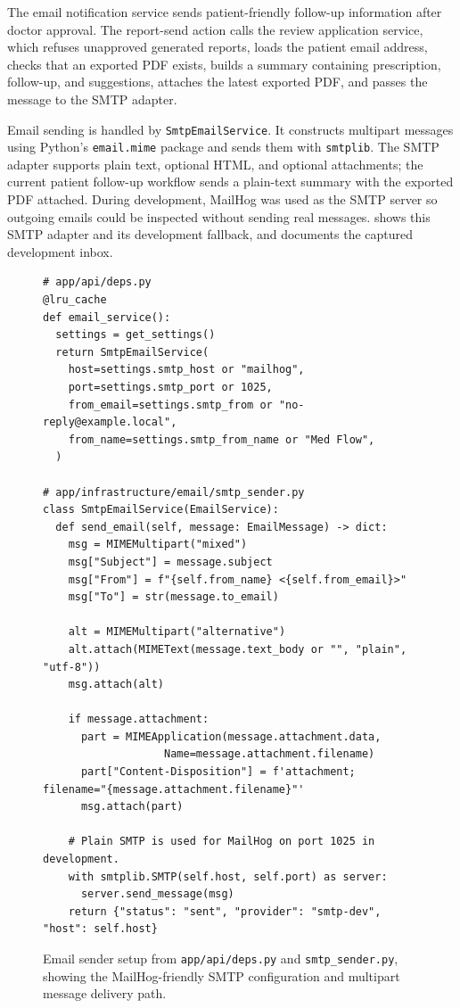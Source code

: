 The email notification service sends patient-friendly follow-up information after doctor approval. The report-send action calls the review application service, which refuses unapproved generated reports, loads the patient email address, checks that an exported PDF exists, builds a summary containing prescription, follow-up, and suggestions, attaches the latest exported PDF, and passes the message to the SMTP adapter.

Email sending is handled by \texttt{SmtpEmailService}. It constructs multipart messages using Python's \texttt{email.mime} package and sends them with \texttt{smtplib}. The SMTP adapter supports plain text, optional HTML, and optional attachments; the current patient follow-up workflow sends a plain-text summary with the exported PDF attached. During development, MailHog was used as the SMTP server so outgoing emails could be inspected without sending real messages.  shows this SMTP adapter and its development fallback, and  documents the captured development inbox.

\begin{figure}[htbp]
\centering
\begin{minipage}{0.92\textwidth}
\begin{verbatim}
# app/api/deps.py
@lru_cache
def email_service():
  settings = get_settings()
  return SmtpEmailService(
    host=settings.smtp_host or "mailhog",
    port=settings.smtp_port or 1025,
    from_email=settings.smtp_from or "no-reply@example.local",
    from_name=settings.smtp_from_name or "Med Flow",
  )

# app/infrastructure/email/smtp_sender.py
class SmtpEmailService(EmailService):
  def send_email(self, message: EmailMessage) -> dict:
    msg = MIMEMultipart("mixed")
    msg["Subject"] = message.subject
    msg["From"] = f"{self.from_name} <{self.from_email}>"
    msg["To"] = str(message.to_email)

    alt = MIMEMultipart("alternative")
    alt.attach(MIMEText(message.text_body or "", "plain", "utf-8"))
    msg.attach(alt)

    if message.attachment:
      part = MIMEApplication(message.attachment.data,
                   Name=message.attachment.filename)
      part["Content-Disposition"] = f'attachment; filename="{message.attachment.filename}"'
      msg.attach(part)

    # Plain SMTP is used for MailHog on port 1025 in development.
    with smtplib.SMTP(self.host, self.port) as server:
      server.send_message(msg)
    return {"status": "sent", "provider": "smtp-dev", "host": self.host}
\end{verbatim}
\end{minipage}
\caption{Email sender setup from \texttt{app/api/deps.py} and \texttt{smtp\_sender.py}, showing the MailHog-friendly SMTP configuration and multipart message delivery path.}
\label{fig:implementation-email-sender}
\end{figure}
\FloatBarrier

